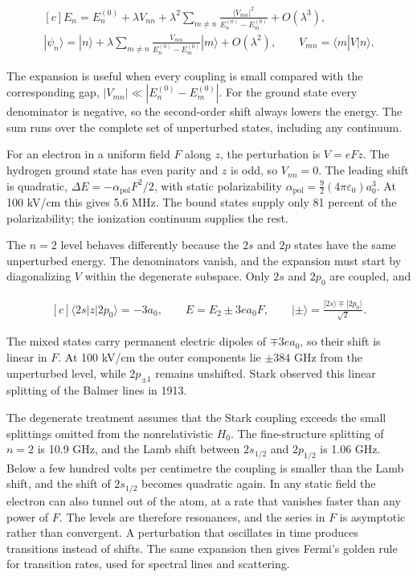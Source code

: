 \documentclass[11pt,oneside]{book}
\newenvironment{centeredalign}{\[\begin{gathered}[c]}{\end{gathered}\]}
\begin{document}
\begin{centeredalign}
E_n=E_n^{(0)}+\lambda V_{nn}
+\lambda^2\sum_{m\neq n}\frac{|V_{mn}|^2}{E_n^{(0)}-E_m^{(0)}}+O(\lambda^3),\\
|\psi_n\rangle=|n\rangle+\lambda\sum_{m\neq n}\frac{V_{mn}}{E_n^{(0)}-E_m^{(0)}}|m\rangle+O(\lambda^2),
\qquad V_{mn}=\langle m|V|n\rangle.
\end{centeredalign}

The expansion is useful when every coupling is small compared with the corresponding gap, \(|V_{mn}|\ll|E_n^{(0)}-E_m^{(0)}|\). For the ground state every denominator is negative, so the second-order shift always lowers the energy. The sum runs over the complete set of unperturbed states, including any continuum.

For an electron in a uniform field \(F\) along \(z\), the perturbation is \(V=eFz\). The hydrogen ground state has even parity and \(z\) is odd, so \(V_{nn}=0\). The leading shift is quadratic, \(\Delta E=-\alpha_{\mathrm{pol}}F^2/2\), with static polarizability \(\alpha_{\mathrm{pol}}=\tfrac92(4\pi\varepsilon_0)a_0^3\). At 100 kV/cm this gives 5.6 MHz. The bound states supply only 81 percent of the polarizability; the ionization continuum supplies the rest.

The \(n=2\) level behaves differently because the \(2s\) and \(2p\) states have the same unperturbed energy. The denominators vanish, and the expansion must start by diagonalizing \(V\) within the degenerate subspace. Only \(2s\) and \(2p_0\) are coupled, and

\begin{centeredalign}
\langle2s|z|2p_0\rangle=-3a_0,\qquad E=E_2\pm3ea_0F,\qquad
|\pm\rangle=\frac{|2s\rangle\mp|2p_0\rangle}{\sqrt2}.
\end{centeredalign}

The mixed states carry permanent electric dipoles of \(\mp3ea_0\), so their shift is linear in \(F\). At 100 kV/cm the outer components lie \(\pm384\) GHz from the unperturbed level, while \(2p_{\pm1}\) remains unshifted. Stark observed this linear splitting of the Balmer lines in 1913.

The degenerate treatment assumes that the Stark coupling exceeds the small splittings omitted from the nonrelativistic \(H_0\). The fine-structure splitting of \(n=2\) is 10.9 GHz, and the Lamb shift between \(2s_{1/2}\) and \(2p_{1/2}\) is 1.06 GHz. Below a few hundred volts per centimetre the coupling is smaller than the Lamb shift, and the shift of \(2s_{1/2}\) becomes quadratic again. In any static field the electron can also tunnel out of the atom, at a rate that vanishes faster than any power of \(F\). The levels are therefore resonances, and the series in \(F\) is asymptotic rather than convergent. A perturbation that oscillates in time produces transitions instead of shifts. The same expansion then gives Fermi's golden rule for transition rates, used for spectral lines and scattering.
\end{document}
